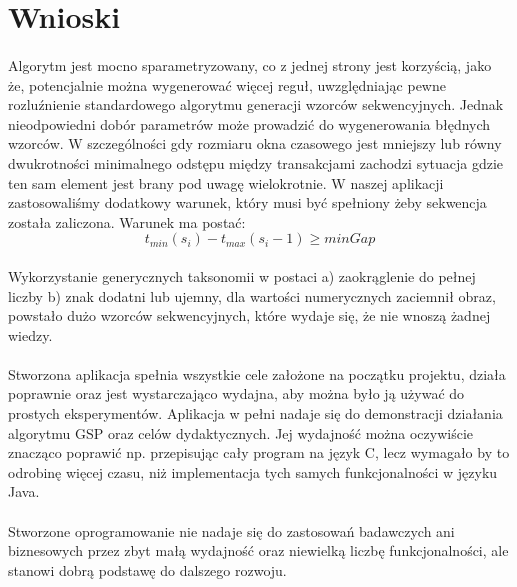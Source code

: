 \documentclass[11pt,a4paper]{article}
\begin{document}
\section{Wnioski}
\paragraph{}Algorytm jest mocno sparametryzowany, co z jednej strony jest korzyścią, jako że, potencjalnie można wygenerować więcej reguł, uwzględniając pewne rozluźnienie standardowego algorytmu generacji wzorców sekwencyjnych. Jednak nieodpowiedni dobór parametrów może prowadzić do wygenerowania błędnych wzorców. W szczególności gdy rozmiaru okna czasowego jest mniejszy lub równy dwukrotności minimalnego odstępu między transakcjami zachodzi sytuacja gdzie ten sam element jest brany pod uwagę wielokrotnie. W naszej aplikacji zastosowaliśmy dodatkowy warunek, który musi być spełniony żeby sekwencja została zaliczona. Warunek ma postać:
\begin{equation}
t_{min}(s_i) - t_{max}(s_i-1) \geq minGap
\end{equation}
\paragraph{}Wykorzystanie generycznych taksonomii w postaci a) zaokrąglenie do pełnej liczby b) znak dodatni lub ujemny, dla wartości numerycznych zaciemnił obraz, powstało dużo wzorców sekwencyjnych, które wydaje się, że nie wnoszą żadnej wiedzy.
\paragraph{}Stworzona aplikacja spełnia wszystkie cele założone na początku projektu, działa poprawnie oraz jest wystarczająco wydajna, aby można było ją używać do prostych eksperymentów. Aplikacja w pełni nadaje się do demonstracji działania algorytmu GSP oraz celów dydaktycznych. Jej wydajność można oczywiście znacząco poprawić np. przepisując cały program na język C, lecz wymagało by to odrobinę więcej czasu, niż implementacja tych samych funkcjonalności w języku Java.
\paragraph{}Stworzone oprogramowanie nie nadaje się do zastosowań badawczych ani biznesowych przez zbyt małą wydajność oraz niewielką liczbę funkcjonalności, ale stanowi dobrą podstawę do dalszego rozwoju.



\nocite{*}


\end{document}

